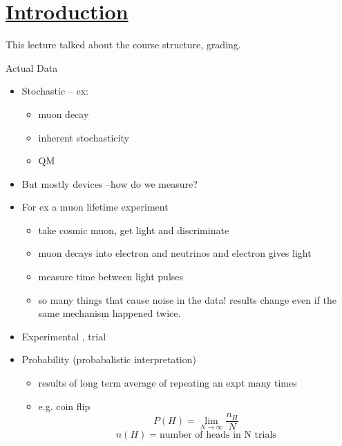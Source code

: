 \section[Introduction]{\hyperlink{toc}{Introduction}}

This lecture talked about the course structure, grading.


Actual Data
\begin{itemize}
    \item Stochastic -- ex:
    \begin{itemize}
        \item muon decay
        \item inherent stochasticity
        \item QM
    \end{itemize}
    \item But mostly devices --how do we measure?
    \item For ex a muon lifetime experiment
    \begin{itemize}
        \item take cosmic muon, get light and discriminate
        \item muon decays into electron and neutrinos and electron gives light
        \item measure time between light pulses
        \item so many things that cause noise in the data! results change even if the same mechanism happened twice.
    \end{itemize}

    \item Experimental , trial
    \item Probability (probabalistic interpretation)
    \begin{itemize}
        \item results of long term average of repeating an expt many times 
        \item e.g. coin flip
        \[P(H) = \lim_{N\to\infty} \frac{n_H}{N}\]
        \[ n(H) = \text{number of heads in N trials}\]
    \end{itemize}


\end{itemize}

